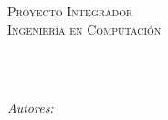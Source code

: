 \documentclass[
11pt, %
spanish, %
singlespacing, %
headsepline, %
]{MastersDoctoralThesis} %
\begin{document}
\frontmatter %

\pagestyle{plain} %


\begin{titlepage}
	\begin{center}
				
				
		\vspace*{.06\textheight}
		{\scshape\LARGE \univname\par}\vspace{0.5cm} %
		{\scshape\LARGE \facname\par}\vspace{1cm}
		\textsc{\Large Proyecto Integrador}\\[0.5cm] %
		\textsc{\Large Ingeniería en Computación}\\[0.5cm]
				
		\HRule \\[0.4cm] %
		{\huge \bfseries \ttitle\par}\vspace{0.3cm} %
		\HRule \\[1.5cm] %
				 
		\begin{minipage}[t]{0.5\textwidth}
			\begin{flushleft} \large
				\emph{Autores:}\\
				\authornameA \\ %
				\matriculanameA \\
				\emailnameA \\
				\hfill \break
				\authornameB \\
				\matriculanameB \\
				\emailnameB \\
				\hfill \break
				\authornameC \\
				\matriculanameC \\
				\emailnameC \\
				

\end{flushleft}
\end{minipage}
\end{center}
\end{titlepage}
\end{document}
